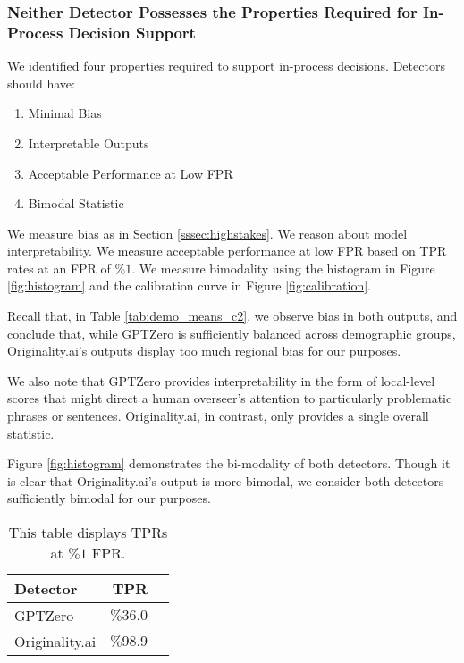 \subsubsection{Neither Detector Possesses the Properties Required for In-Process Decision Support}
We identified four properties required to support in-process decisions. Detectors should have:

\begin{enumerate}
    \item Minimal Bias
    \item Interpretable Outputs
    \item Acceptable Performance at Low FPR
    \item Bimodal Statistic
\end{enumerate}

We measure bias as in Section \ref{sssec:highstakes}. We reason about model interpretability. We measure acceptable performance at low FPR based on TPR rates at an FPR of $\%1$. We measure bimodality using the histogram in Figure \ref{fig:histogram} and the calibration curve in Figure \ref{fig:calibration}.

Recall that, in Table \ref{tab:demo_means_c2}, we observe bias in both outputs, and conclude that, while GPTZero is sufficiently balanced across demographic groups, Originality.ai's outputs display too much regional bias for our purposes. 

We also note that GPTZero provides interpretability in the form of local-level scores that might direct a human overseer's attention to particularly problematic phrases or sentences. Originality.ai, in contrast, only provides a single overall statistic. 

Figure \ref{fig:histogram} demonstrates the bi-modality of both detectors. Though it is clear that Originality.ai's output is more bimodal, we consider both detectors sufficiently bimodal for our purposes.

\begin{table*}[htbp]
  \centering
  \caption{This table displays TPRs at $\%1$ FPR.}
  \label{tab:tprs}
  \begin{tabular}{l r r}
      \toprule
      Detector & TPR \\
      \midrule
      GPTZero & $\%36.0$ \\
      Originality.ai & $\%98.9$ \\
      \bottomrule
  \end{tabular}
\end{table*}

